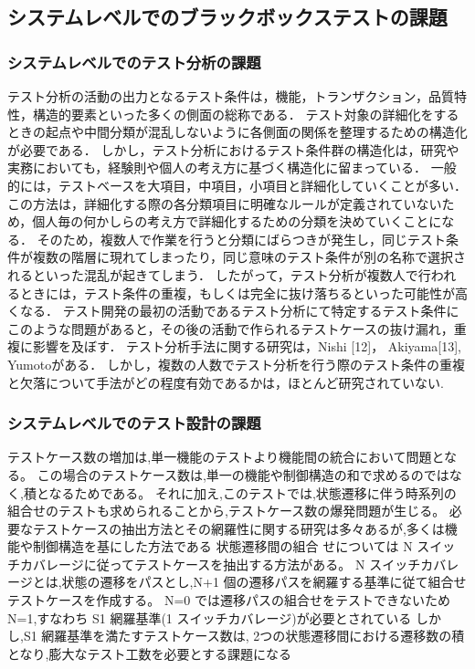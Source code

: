 \documentclass[10pt,a4j]{jarticle}
\begin{document}
\subsection{システムレベルでのブラックボックステストの課題} \label{sec:2-2}
\subsubsection{システムレベルでのテスト分析の課題}
テスト分析の活動の出力となるテスト条件は，機能，トランザクション，品質特性，構造的要素といった多くの側面の総称である．
テスト対象の詳細化をするときの起点や中間分類が混乱しないように各側面の関係を整理するための構造化が必要である．
しかし，テスト分析におけるテスト条件群の構造化は，研究や実務においても，経験則や個人の考え方に基づく構造化に留まっている．
一般的には，テストベースを大項目，中項目，小項目と詳細化していくことが多い．
この方法は，詳細化する際の各分類項目に明確なルールが定義されていないため，個人毎の何かしらの考え方で詳細化するための分類を決めていくことになる．
そのため，複数人で作業を行うと分類にばらつきが発生し，同じテスト条件が複数の階層に現れてしまったり，同じ意味のテスト条件が別の名称で選択されるといった混乱が起きてしまう．
したがって，テスト分析が複数人で行われるときには，テスト条件の重複，もしくは完全に抜け落ちるといった可能性が高くなる．
テスト開発の最初の活動であるテスト分析にて特定するテスト条件にこのような問題があると，その後の活動で作られるテストケースの抜け漏れ，重複に影響を及ぼす．
テスト分析手法に関する研究は，Nishi [12]， Akiyama[13], Yumoto\cite{yumoto2013test}がある．
しかし，複数の人数でテスト分析を行う際のテスト条件の重複と欠落について手法がどの程度有効であるかは，ほとんど研究されていない.

\subsubsection{システムレベルでのテスト設計の課題}
テストケース数の増加は,単一機能のテストより機能間の統合において問題となる。
この場合のテストケース数は,単一の機能や制御構造の和で求めるのではなく,積となるためである。
それに加え,このテストでは,状態遷移に伴う時系列の組合せのテストも求められることから,テストケース数の爆発問題が生じる。
必要なテストケースの抽出方法とその網羅性に関する研究は多々あるが,多くは機能や制御構造を基にした方法である
状態遷移間の組合 せについては N スイッチカバレージに従ってテストケースを抽出する方法がある。
N スイッチカバレージとは,状態の遷移をパスとし,N+1 個の遷移パスを網羅する基準に従て組合せテストケースを作成する。
N=0 では遷移パスの組合せをテストできないため N=1,すなわち S1 網羅基準(1 スイッチカバレージ)が必要とされている
しかし,S1 網羅基準を満たすテストケース数は, 2つの状態遷移間における遷移数の積となり,膨大なテスト工数を必要とする課題になる
\end{document}
